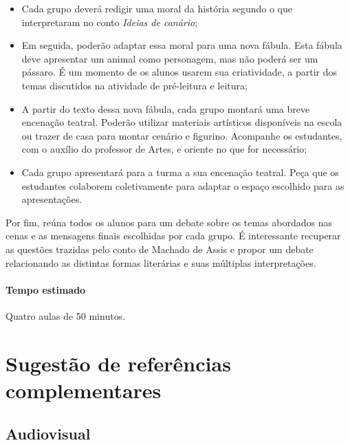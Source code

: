 \documentclass[11pt]{extarticle}
\begin{document}
\begin{itemize}

\item Cada grupo deverá redigir uma moral da história segundo o que interpretaram no conto \textit{Ideias de canário};

\item Em seguida, poderão adaptar essa moral para uma nova fábula. Esta fábula deve apresentar um animal como personagem, mas não poderá ser um pássaro. É um momento de os alunos usarem sua criatividade, a partir dos temas discutidos na atividade de pré-leitura e leitura;

\item A partir do texto dessa nova fábula, cada grupo montará uma breve encenação teatral. Poderão utilizar materiais artísticos disponíveis na escola ou trazer de casa para montar cenário e figurino. Acompanhe os estudantes, com o auxílio do professor de Artes, e oriente no que for necessário;

\item Cada grupo apresentará para a turma a sua encenação teatral. Peça que os estudantes colaborem coletivamente para adaptar o espaço escolhido para as apresentações. 

\end{itemize}


Por fim, reúna todos os alunos para um debate sobre os temas abordados nas cenas e as mensagens finais escolhidas por cada grupo. É interessante recuperar as questões trazidas pelo conto de Machado de Assis e propor um debate relacionando as distintas formas literárias e suas múltiplas interpretações.

\paragraph{Tempo estimado} Quatro aulas de 50 minutos.

\section{Sugestão de referências complementares}

\subsection{Audiovisual}
\end{document}
